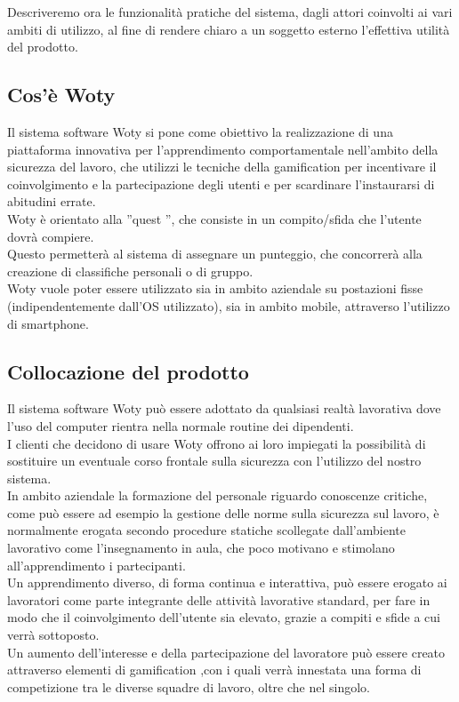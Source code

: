 Descriveremo ora le funzionalità pratiche del sistema, dagli attori coinvolti ai vari ambiti di utilizzo, al fine di rendere chiaro a un soggetto esterno l'effettiva utilità del prodotto.

\subsection{Cos'è Woty}

Il sistema software Woty si pone come obiettivo la realizzazione di una piattaforma innovativa per l’apprendimento comportamentale nell’ambito della sicurezza del lavoro, che utilizzi le tecniche della gamification per incentivare il coinvolgimento e la partecipazione degli utenti e per scardinare l’instaurarsi di abitudini errate.\\
Woty è orientato alla ”quest ”, che consiste in un compito/sfida che l’utente dovrà compiere.\\
Questo permetterà al sistema di assegnare un punteggio, che concorrerà alla creazione di classifiche personali o di gruppo.\\
Woty vuole poter essere utilizzato sia in ambito aziendale su postazioni fisse (indipendentemente dall’OS utilizzato), sia in ambito mobile, attraverso l’utilizzo di smartphone.\\

\subsection{Collocazione del prodotto}

Il sistema software Woty può essere adottato da qualsiasi realtà lavorativa dove l’uso del computer rientra nella normale routine dei dipendenti. \\
I clienti che decidono di usare Woty offrono ai loro impiegati la possibilità di sostituire un eventuale corso frontale sulla sicurezza con l’utilizzo del nostro sistema.\\
In ambito aziendale la formazione del personale riguardo conoscenze critiche, come può essere ad esempio la gestione delle norme sulla sicurezza sul lavoro, è normalmente erogata secondo procedure statiche scollegate dall’ambiente lavorativo come l’insegnamento in aula, che poco motivano e stimolano all’apprendimento i partecipanti.\\
Un apprendimento diverso, di forma continua e interattiva, può essere erogato ai lavoratori come parte integrante delle attività lavorative standard, per fare in modo che il coinvolgimento dell’utente sia elevato, grazie a compiti e sfide a cui verrà sottoposto.\\
Un aumento dell’interesse e della partecipazione del lavoratore può essere creato attraverso elementi di gamification ,con i quali verrà innestata una forma di competizione tra le diverse squadre di lavoro, oltre che nel singolo.

